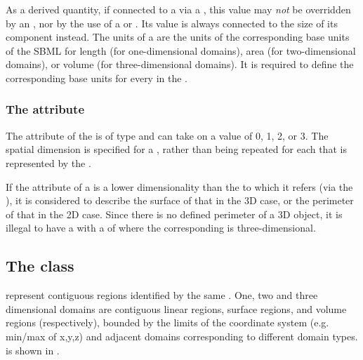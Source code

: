 As a derived quantity, if connected to a \Parameter via a \SpatialSymbolReference, this value may \emph{not} be overridden by an \InitialAssignment, nor by the use of a \Rule or \Event.  Its value is always connected to the size of its component \Domains instead.  The units of a \DomainType are the units of the corresponding base units of the SBML \Model for length (for one-dimensional domains), area (for two-dimensional domains), or volume (for three-dimensional domains).  It is required to define the corresponding base units for every \DomainType in the \Model.

\subsubsection{The \fixttspace{} attribute}
The  attribute of the \DomainType is of type  and can take on a value of 0, 1, 2, or 3. The spatial dimension is specified for a \DomainType, rather than being repeated for each \Domain that is represented by the \DomainType.

If the  attribute of a \DomainType is a lower dimensionality than the \Geometry to which it refers (via the \Domain), it is considered to describe the surface of that \Geometry in the 3D case, or the perimeter of that \Geometry in the 2D case.  Since there is no defined perimeter of a 3D object, it is illegal to have a \DomainType with a  of  where the corresponding \Geometry is three-dimensional.


\subsection{The  class}
\label{domain-class}
\label{listofinteriorpoints-class}
\Domains represent contiguous regions identified by the same \DomainType.  One, two and three dimensional domains are contiguous linear regions, surface regions, and volume regions (respectively), bounded by the limits of the coordinate system (e.g. min/max of x,y,z) and adjacent domains corresponding to different domain types.  \Domain is shown in .
 
